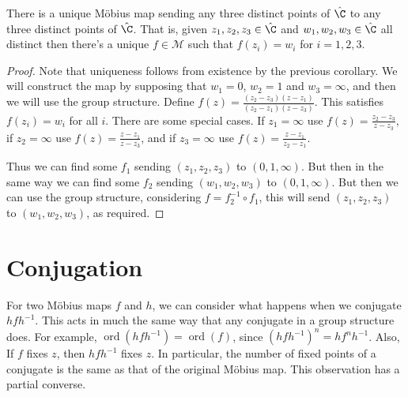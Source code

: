 \documentclass[a4]{scrreprt}
\newcommand{\newsection}{\section}
\begin{document}
\begin{theorem}
	There is a unique Möbius map sending any three distinct points of $\hat{\C}$ to any three distinct points of $\hat{\C}$. That is, given $z_1, z_2, z_3 \in \hat{\C}$ and $w_1, w_2, w_3 \in \hat{\C}$ all distinct then there's a unique $f \in \mathcal{M}$ such that $f(z_i) = w_i$ for $i = 1, 2, 3$. 
\end{theorem}
\begin{proof}
	Note that uniqueness follows from existence by the previous corollary. We will construct the map by supposing that $w_1 = 0$, $w_2 = 1$ and $w_3 = \infty$, and then we will use the group structure.
	Define $f(z) = \frac{(z_2 - z_3)(z - z_1)}{(z_2 - z_1)(z - z_3)}$. This satisfies $f(z_i) = w_i$ for all $i$. There are some special cases. If $z_1 = \infty$ use $f(z) = \frac{z_2 - z_3}{z - z_3}$, if $z_2 = \infty$ use $f(z) = \frac{z - z_1}{z - z_3}$, and if $z_3 = \infty$ use $f(z) = \frac{z - z_1}{z_2 - z_1}$.

	Thus we can find some $f_1$ sending $(z_1, z_2, z_3)$ to $(0, 1, \infty)$. But then in the same way we can find some $f_2$ sending $(w_1, w_2, w_3)$ to $(0, 1, \infty)$. But then we can use the group structure, considering $f = f_2^{-1} \circ f_1$, this will send $(z_1, z_2, z_3)$ to $(w_1, w_2, w_3)$, as required.
\end{proof}

\newsection{Conjugation}

For two Möbius maps $f$ and $h$, we can consider what happens when we conjugate $h fh^{-1}$. This acts in much the same way that any conjugate in a group structure does. For example, $\operatorname{ord}(hfh^{-1}) = \operatorname{ord}(f)$, since $(hfh^{-1})^{n} = hf^{n} h^{-1}$. Also, If $f$ fixes $z$, then $h fh^{-1}$ fixes $z$. In particular, the number of fixed points of a conjugate is the same as that of the original Möbius map. This observation has a partial converse.
\end{document}
